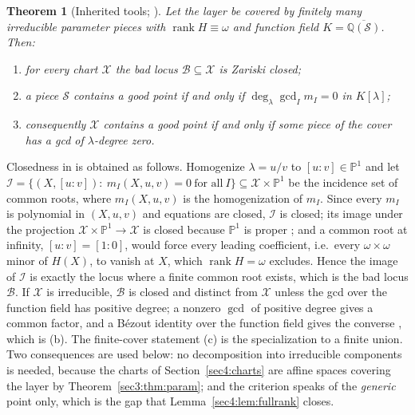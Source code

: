 \documentclass[journal]{IEEEtran}
\theoremstyle{plainn}
\newtheorem{thm}{Theorem}
\theoremstyle{remark}
\newcommand{\rank}{\operatorname{rank}}
\begin{document}
\begin{thm}[Inherited tools; \cite{companion1}]
\label{sec4:thm:closed}
\label{sec4:thm:generic}
\label{sec4:prop:cover}
Let the layer be covered by finitely many irreducible parameter pieces with $\rank H\equiv\omega$ and
function field $K=\overline{\mathbb Q(\mathcal S)}$. Then:
\begin{enumerate}[label=(\alph*),leftmargin=*]
\item \label{it:closed} for every chart $\mathcal X$ the bad locus $\mathcal B\subseteq\mathcal X$ is
Zariski closed;
\item \label{it:generic} a piece $\mathcal S$ contains a good point if and only if
$\deg_\lambda\gcd_I m_I=0$ in $K[\lambda]$;
\item \label{it:cover} consequently $\mathcal X$ contains a good point if and only if some piece of the
cover has a gcd of $\lambda$-degree zero.
\end{enumerate}
\end{thm}

Closedness in \cite{companion1} is obtained as follows. Homogenize $\lambda=u/v$ to
$[u{:}v]\in\mathbb P^1$ and let
$\mathcal I=\{(X,[u{:}v]):\ m_I(X,u,v)=0\ \text{for all}\ I\}\subseteq\mathcal X\times\mathbb P^1$ be
the incidence set of common roots, where $m_I(X,u,v)$ is the homogenization of $m_I$. Since every
$m_I$ is polynomial in $(X,u,v)$ and equations are closed, $\mathcal I$ is closed; its image under the
projection $\mathcal X\times\mathbb P^1\to\mathcal X$ is closed because $\mathbb P^1$ is proper
\cite{bpr06}; and a common root at infinity, $[u{:}v]=[1{:}0]$, would force every leading coefficient,
i.e.\ every $\omega\times\omega$ minor of $H(X)$, to vanish at $X$, which $\rank H=\omega$ excludes.
Hence the image of $\mathcal I$ is exactly the locus where a finite common root exists, which is the
bad locus $\mathcal B$. If $\mathcal X$ is irreducible, $\mathcal B$ is closed and distinct from
$\mathcal X$ unless the gcd over the function field has positive degree; a nonzero $\gcd$ of positive
degree gives a common factor, and a Bézout identity over the function field gives the converse
\cite{lan02}, which is (b). The finite-cover statement (c) is the specialization to a finite union.
Two consequences are used below: no decomposition into irreducible components is needed, because the
charts of Section~\ref{sec4:charts} are affine spaces covering the layer by
Theorem~\ref{sec3:thm:param}; and the criterion speaks of the \emph{generic} point only, which is the
gap that Lemma~\ref{sec4:lem:fullrank} closes.
\end{document}
